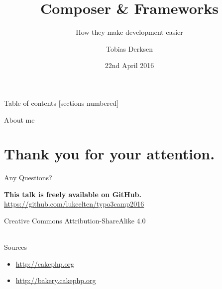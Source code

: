 \documentclass{beamer}
\title{Composer \& Frameworks}
\subtitle{How they make development easier}
\date{22nd April 2016}
\author{Tobias Derksen}
\institute{Fontys School of Technology \& Logistics}
\begin{document}
  \maketitle

  \begin{frame}{Table of contents}
    [sections numbered]
    \tableofcontents[hideallsubsections]
  \end{frame}


  \begin{frame}{About me}

  \end{frame}

  
  

	\section*{Thank you for your attention.}
	\begin{frame}[standout]
		Any Questions?
	\end{frame}
	
	\appendix
	
	\begin{frame}{}
		\textbf{This talk is freely available on GitHub.} \\
		\url{https://github.com/lukeelten/typo3camp2016}
		\vfill
		\begin{center}
			Creative Commons Attribution-ShareAlike 4.0 ~\\~\\
			\ccbysa
		\end{center}
	\end{frame}
	
	\begin{frame}{Sources}
		\begin{itemize}
			\item \url{http://cakephp.org}
			\item \url{http://bakery.cakephp.org}
		\end{itemize}
	\end{frame}
\end{document}
